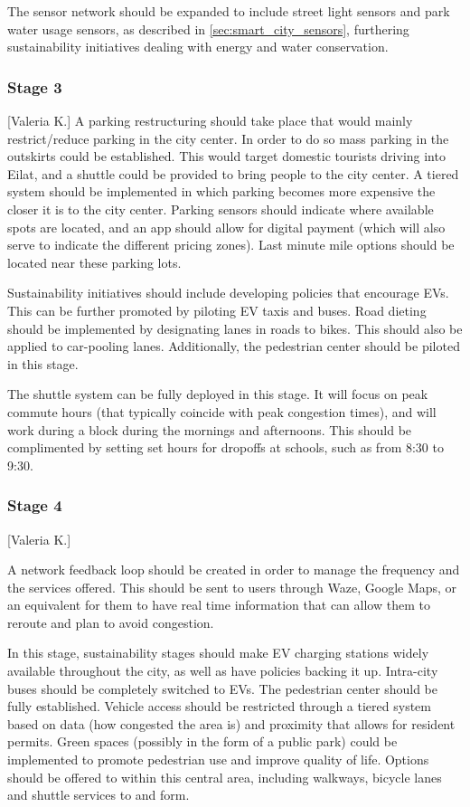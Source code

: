 \documentclass[12pt]{article}                       %
\begin{document}
The sensor network should be expanded to include street light sensors and park water usage sensors, as described in \ref{sec:smart_city_sensors}, furthering sustainability initiatives dealing with energy and water conservation.

\subsubsection{Stage 3}[Valeria K.]
A parking restructuring should take place that would mainly restrict/reduce parking in the city center. In order to do so mass parking in the outskirts could be established. This would target domestic tourists driving into Eilat, and a shuttle could be provided to bring people to the city center. A tiered system should be implemented in which parking becomes more expensive the closer it is to the city center. Parking sensors should indicate where available spots are located, and an app should allow for digital payment (which will also serve to indicate the different pricing zones). Last minute mile options should be located near these parking lots.

Sustainability initiatives should include developing policies that encourage EVs. This can be further promoted by piloting EV taxis and buses. Road dieting should be implemented by designating lanes in roads to bikes. This should also be applied to car-pooling lanes. Additionally, the pedestrian center should be piloted in this stage.

The shuttle system can be fully deployed in this stage. It will focus on peak commute hours (that typically coincide with peak congestion times), and will work during a block during the mornings and afternoons. This should be complimented by setting set hours for dropoffs at schools, such as from 8:30 to 9:30.

\subsubsection{Stage 4}[Valeria K.]

A network feedback loop should be created in order to manage the frequency and the services offered. This should be sent to users through Waze, Google Maps, or an equivalent for them to have real time information that can allow them to reroute and plan to avoid congestion.

In this stage, sustainability stages should make EV charging stations widely available throughout the city, as well as have policies backing it up. Intra-city buses should be completely switched to EVs. The pedestrian center should be fully established. Vehicle access should be restricted through a tiered system based on data (how congested the area is) and proximity that allows for resident permits. Green spaces (possibly in the form of a public park) could be implemented to promote pedestrian use and improve quality of life. Options should be offered to within this central area, including walkways, bicycle lanes and shuttle services to and form. 
\end{document}
